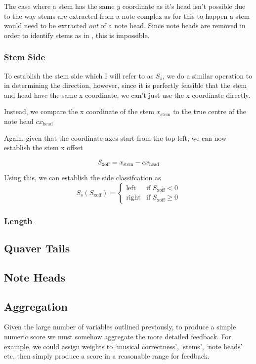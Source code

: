 The case where a stem has the same $y$ coordinate as it's head isn't possible due to the way stems are extracted from a note complex as for this to happen a stem would need to be extracted \emph{out} of a note head. Since note heads are removed in order to identify stems as in , this is impossible.

\subsubsection{Stem Side}
To establish the stem side which I will refer to as $S_s$, we do a similar operation to in determining the direction, however, since it is perfectly feasible that the stem and head have the same x coordinate, we can't just use the x coordinate directly.

Instead, we compare the x coordinate of the stem $x_{\text{stem}}$ to the true centre  of the note head $cx_{\text{head}}$

Again, given that the coordinate axes start from the top left, we can now establish the stem x offset

$$
S_\text{xoff} = x_{\text{stem}} - cx_{\text{head}}
$$

Using this, we can establish the side classifcation as
$$
S_{s} (S_\text{xoff}) =
\left\{
	\begin{array}{ll}
		\text{left}   & \mbox{if } S_\text{xoff} < 0 \\
		\text{right}  & \mbox{if } S_\text{xoff} \ge 0
	\end{array}
\right.
$$


\subsubsection{Length}

\subsection{Quaver Tails}

\subsection{Note Heads}

\subsection{Aggregation}
Given the large number of variables outlined previously, to produce a simple numeric score we must somehow aggregate the more detailed feedback. For example, we could assign weights to `musical correctness', `stems', `note heads' etc, then simply produce a score in a reasonable range for feedback.
